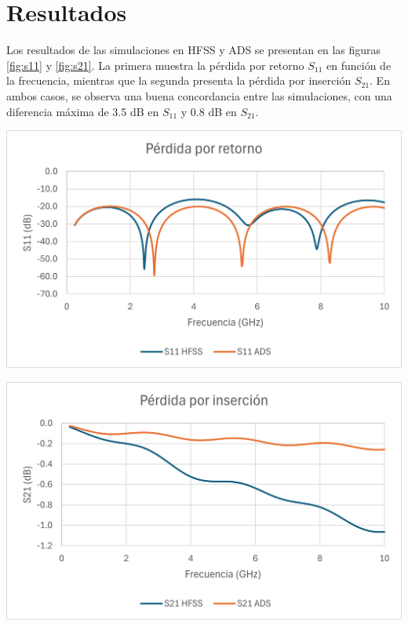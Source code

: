\documentclass{article}   %
\theoremstyle{mytheoremstyle}
\theoremstyle{mytheoremstyle}
\theoremstyle{myproblemstyle}
\begin{document}
    \begin{minipage}{0.49\textwidth}   %
        {\centering\section*{\large Resultados}}

        Los resultados de las simulaciones en HFSS y ADS se presentan en las figuras \ref{fig:s11} y \ref{fig:s21}. La primera
        muestra la pérdida por retorno $S_{11}$ en función de la frecuencia, mientras que la segunda presenta la pérdida por
        inserción $S_{21}$. En ambos casos, se observa una buena concordancia entre las simulaciones, con una diferencia
        máxima de 3.5 dB en $S_{11}$ y 0.8 dB en $S_{21}$.

        
        \includegraphics[width=\textwidth]{figures/s11.png}
        \label{fig:s11}

        \vspace{5 mm}

        \includegraphics[width=\textwidth]{figures/s21.png}
        \label{fig:s21}
        

\end{minipage}
\end{document}
